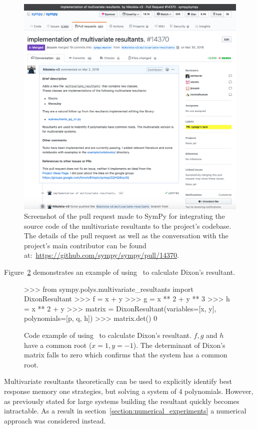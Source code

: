 \begin{figure}[!htbp]
    \centering
    \includegraphics[width=.77\linewidth]{src/chapters/05/pr_screenshot}
    \caption{Screenshot of the pull request made to SymPy for integrating the
    source code of the multivariate resultants to the project's codebase.
    The details of the pull request as well as the conversation with the
    project's main contributor can be found at:~\url{https://github.com/sympy/sympy/pull/14370}.}
    \label{fig:sympy_pr}
\end{figure}

Figure~\ref{fig:dixon_example} demonstrates an example of using~\cite{sympy} to calculate Dixon's resultant.

\begin{figure}
\begin{usagepy}
>>> from sympy.polys.multivariate_resultants import DixonResultant
>>> f = x + y
>>> g = x ** 2 + y ** 3
>>> h = x ** 2 + y
>>> matrix = DixonResultant(variables=[x, y], polynomials=[p, q, h])
>>> matrix.det()
0 
\end{usagepy}
\caption{Code example of using~\cite{sympy} to calculate Dixon's resultant.
\(f, g\) and \(h\) have a common root (\(x=1, y=-1\)). The determinant
of Dixon's matrix falls to zero which confirms that the system has a common root.}\label{fig:dixon_example}
\end{figure}

Multivariate resultants theoretically can be used to explicitly identify best
response memory one strategies, but solving a system of 4 polynomials. However,
as previously stated for large systems building the resultant quickly becomes
intractable. As a result in section~\ref{section:numerical_experiments}
a numerical approach was considered instead.

